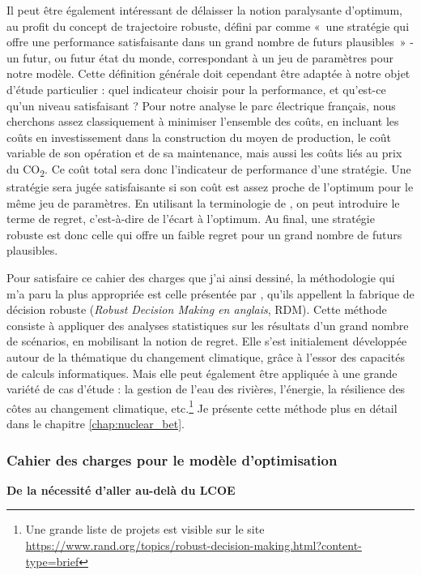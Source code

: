 Il peut être également intéressant de délaisser la notion paralysante d’optimum, au profit du concept de trajectoire robuste, défini par \citet{Lempert2006} comme «~une stratégie qui offre une performance satisfaisante dans un grand nombre de futurs plausibles~» - un futur, ou futur état du monde, correspondant à un jeu de paramètres pour notre modèle.
Cette définition générale doit cependant être adaptée à notre objet d’étude particulier : quel indicateur choisir pour la performance, et qu’est-ce qu’un niveau satisfaisant ?
Pour notre analyse le parc électrique français, nous cherchons assez classiquement à minimiser l'ensemble des coûts, en incluant les coûts en investissement dans la construction du moyen de production, le coût variable de son opération et de sa maintenance, mais aussi les coûts liés au prix du CO\textsubscript{2}. Ce coût total sera donc l’indicateur de performance d’une stratégie.
Une stratégie sera jugée satisfaisante si son coût est assez proche de l’optimum pour le même jeu de paramètres. En utilisant la terminologie de \citet{Savage1950}, on peut introduire le terme de regret, c’est-à-dire de l’écart à l’optimum. Au final, une stratégie robuste est donc celle qui offre un faible regret pour un grand nombre de futurs plausibles.

Pour satisfaire ce cahier des charges que j’ai ainsi dessiné, la méthodologie qui m’a paru la plus appropriée est celle présentée par  \citet{Lempert2006}, qu’ils appellent la fabrique de décision robuste (\textit{Robust Decision Making en anglais}, RDM). Cette méthode consiste à appliquer des analyses statistiques sur les résultats d’un grand nombre de scénarios, en mobilisant la notion de regret. Elle s’est initialement développée autour de la thématique du changement climatique, grâce à l’essor des capacités de calculs informatiques. Mais elle peut également être appliquée à une grande variété de cas d’étude : la gestion de l’eau des rivières, l’énergie, la résilience des côtes au changement climatique, etc.\footnote{Une grande liste de projets est visible sur le site \url{https://www.rand.org/topics/robust-decision-making.html?content-type=brief}} Je présente cette méthode plus en détail dans le chapitre \ref{chap:nuclear_bet}.
	
\subsubsection{Cahier des charges pour le modèle d’optimisation}

\textbf{De la nécessité d’aller au-delà du LCOE}

